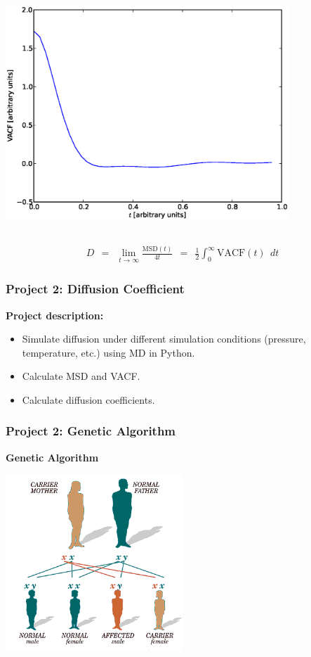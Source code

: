 \documentclass{beamer}
\begin{document}
{\begin{columns}[c]
        \includegraphics[width=0.8\textwidth]{images/diffusion_vacf.eps}

    \end{columns}

    \begin{align*}
        D \ \ = \ \ \lim_{t\rightarrow \infty} \frac{\mathrm{MSD}(t)}{4t}
          \ \ = \ \ \frac{1}{2} \int_0^\infty \mathrm{VACF}(t) \ \ dt
    \end{align*}

}


\frame
{
  \frametitle{Project 2: Diffusion Coefficient}
  {\bf Project description:}

  \smallskip

  \begin{itemize}
    \item Simulate diffusion under different simulation conditions
            (pressure, temperature, etc.) using MD in Python.
    \vspace{0.2in}
    \item Calculate MSD and VACF.
    \vspace{0.2in}
    \item Calculate diffusion coefficients.
  \end{itemize}

}


\frame
{
    \frametitle{Project 2: Genetic Algorithm}

    \centering
    {\bf Genetic Algorithm}

    \begin{center}
        \includegraphics[width=0.5\textwidth]{images/genetics_family.png}
    \end{center}
}
\end{document}
